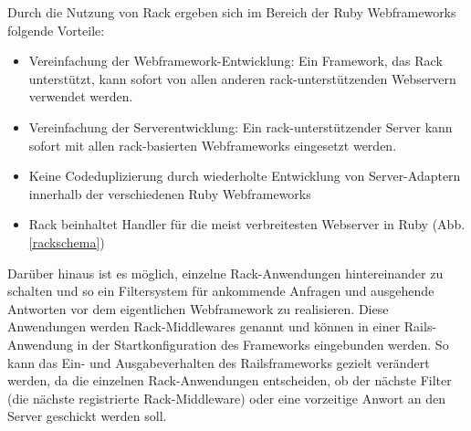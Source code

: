 Durch die Nutzung von Rack ergeben sich im Bereich der Ruby Webframeworks folgende Vorteile:

\begin{itemize}
\item
Vereinfachung der Webframework-Entwicklung: Ein Framework, das Rack unterstützt, kann sofort von allen anderen rack-unterstützenden Webservern verwendet werden.
\item
Vereinfachung der Serverentwicklung: Ein rack-unterstützender Server kann sofort mit allen rack-basierten Webframeworks eingesetzt werden.
\item
Keine Codeduplizierung durch wiederholte Entwicklung von Server-Adaptern innerhalb der verschiedenen Ruby Webframeworks
\item
Rack beinhaltet Handler für die meist verbreitesten Webserver in Ruby (Abb. \ref{rackschema})
\end{itemize}


Darüber hinaus ist es  möglich, einzelne Rack-Anwendungen hintereinander zu schalten und so ein Filtersystem für ankommende Anfragen und ausgehende Antworten vor dem eigentlichen Webframework zu realisieren.
Diese Anwendungen werden Rack-Middlewares genannt und können in einer Rails-Anwendung in der Startkonfiguration des Frameworks eingebunden werden. So kann das Ein- und Ausgabeverhalten des Railsframeworks gezielt verändert werden, da die einzelnen Rack-Anwendungen entscheiden, ob der nächste Filter (die nächste registrierte Rack-Middleware) oder eine vorzeitige Anwort an den Server geschickt werden soll.

